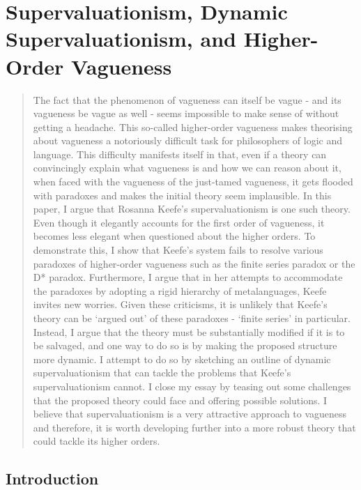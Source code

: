 \chapter{Supervaluationism, Dynamic Supervaluationism, and Higher-Order Vagueness}

\renewcommand*{\thesection}{\arabic{section}.}
\renewcommand*{\thesubsection}{\arabic{section}.\arabic{subsection}.}

\begin{quote}
The fact that the phenomenon of vagueness can itself be vague
- and its vagueness be vague as well - seems impossible to make sense of
without getting a headache. This so-called higher-order vagueness makes
theorising about vagueness a notoriously difficult task for philosophers
of logic and language. This difficulty manifests itself in that, even if
a theory can convincingly explain what vagueness is and how we can
reason about it, when faced with the vagueness of the just-tamed
vagueness, it gets flooded with paradoxes and makes the initial theory
seem implausible. In this paper, I argue that Rosanna Keefe's
supervaluationism is one such theory. Even though it elegantly accounts
for the first order of vagueness, it becomes less elegant when
questioned about the higher orders. To demonstrate this, I show that
Keefe's system fails to resolve various paradoxes of higher-order
vagueness such as the finite series paradox or the D* paradox.
Furthermore, I argue that in her attempts to accommodate the paradoxes
by adopting a rigid hierarchy of metalanguages, Keefe invites new
worries. Given these criticisms, it is unlikely that Keefe's theory can
be `argued out' of these paradoxes - `finite series' in particular.
Instead, I argue that the theory must be substantially modified if it is
to be salvaged, and one way to do so is by making the proposed structure
more dynamic. I attempt to do so by sketching an outline of dynamic
supervaluationism that can tackle the problems that Keefe's
supervaluationism cannot. I close my essay by teasing out some
challenges that the proposed theory could face and offering possible
solutions. I believe that supervaluationism is a very attractive
approach to vagueness and therefore, it is worth developing further into
a more robust theory that could tackle its higher orders.
\end{quote}

\section{Introduction}

